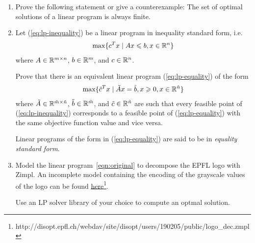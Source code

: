 \begin{enumerate}[1)]
\item Prove the following statement or give a counterexample:
The set of optimal solutions of a linear program is always finite.
\item Let (\ref{eq:lp-inequality}) be a linear program in inequality standard form, i.e.
\begin{equation} \label{eq:lp-inequality}
\max\{ c^T x \mid Ax \leqslant b, x \in \mathbb{R}^n \}
\end{equation}
where $A \in \mathbb{R}^{m \times n}$, $b\in \mathbb{R}^m$, and $c\in\mathbb{R}^n$.

Prove that there is an equivalent linear program (\ref{eq:lp-equality}) of the form
\begin{equation} \label{eq:lp-equality}
\max\{ \tilde c^T x \mid \tilde Ax = \tilde b, x \geqslant 0, x \in \mathbb{R}^{\tilde n} \}
\end{equation}
where $\tilde A \in \mathbb{R}^{\tilde m \times \tilde n}$, $\tilde b \in \mathbb{R}^{\tilde m}$, and $\tilde c \in \mathbb{R}^{\tilde n}$
are such that every feasible point of (\ref{eq:lp-inequality}) corresponds to a feasible point of (\ref{eq:lp-equality})
with the same objective function value and vice versa.

Linear programs of the form in (\ref{eq:lp-equality}) are said to be in \emph{equality standard form}.

\item  Model the linear program~\eqref{eqn:original} to decompose the EPFL logo with Zimpl. 
An incomplete model containing the encoding of the grayscale values of the logo can be found \href{http://disopt.epfl.ch/webdav/site/disopt/users/190205/public/logo\_dec.zmpl}{here}\footnote{http://disopt.epfl.ch/webdav/site/disopt/users/190205/public/logo\_dec.zmpl}.

Use an LP solver library of your choice to compute an optmal solution.

\end{enumerate}


% 

% 


